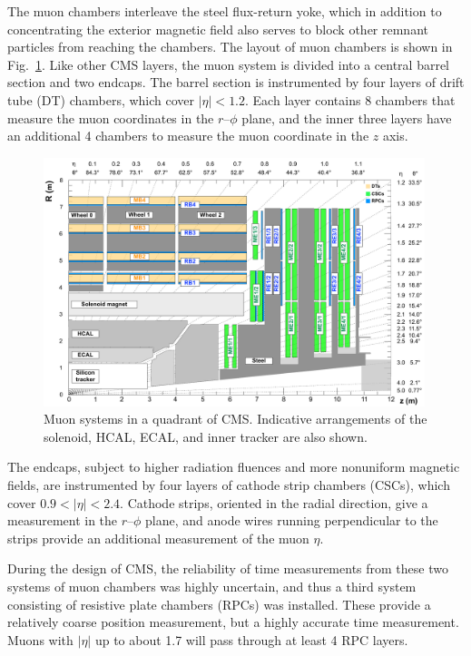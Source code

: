 \documentclass[oneside, letterpaper, 12pt, oldfontcommands]{memoir}
\begin{document}
The muon chambers interleave the steel flux-return yoke, which in addition to concentrating the exterior magnetic field also serves
to block other remnant particles from reaching the chambers. The layout of muon chambers is shown in Fig.~\ref{fig:muon_system}.
Like other CMS layers, the muon system is divided into a central barrel section and two endcaps. The barrel section is instrumented by four
layers of drift tube (DT) chambers, which cover $|\eta| < 1.2$. Each layer contains 8 chambers that measure the muon coordinates in the $r$--$\phi$
plane, and the inner three layers have an additional 4 chambers to measure the muon coordinate in the $z$ axis.

\begin{figure}[hbtp]
  \begin{center}
    \includegraphics[width=0.99\textwidth]{Figures/muon_system.pdf}
    \caption{
    Muon systems in a quadrant of CMS. Indicative arrangements of the solenoid, HCAL, ECAL, and inner
    tracker are also shown.
    }
    \label{fig:muon_system}
  \end{center}
\end{figure}

The endcaps, subject to higher radiation fluences and more nonuniform magnetic fields, are instrumented by four layers of cathode strip chambers (CSCs),
which cover $0.9 < |\eta| < 2.4$. Cathode strips, oriented in the radial direction, give a measurement in the $r$--$\phi$ plane, and anode
wires running perpendicular to the strips provide an additional measurement of the muon $\eta$.

During the design of CMS, the reliability of time measurements from these two systems of muon chambers was highly uncertain, and thus a third system
consisting of resistive plate chambers (RPCs) was installed. These provide a relatively coarse position measurement, but a highly
accurate time measurement. Muons with $|\eta|$ up to about 1.7 will pass through at least 4 RPC layers.
\end{document}
